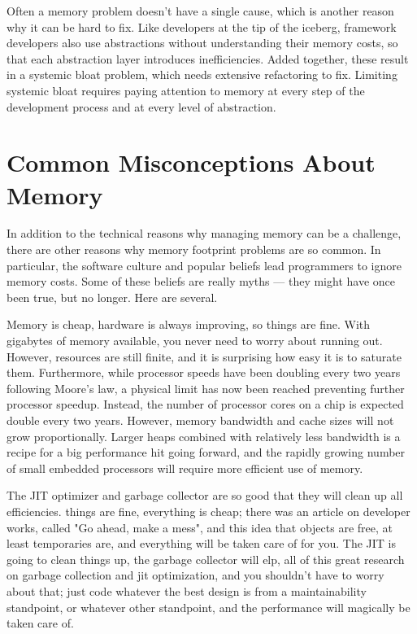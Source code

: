 Often a memory problem doesn't have a single cause, which is another reason why
it can be hard to fix. Like developers at the tip of the iceberg, framework
developers also use abstractions without understanding their memory costs, so
that each abstraction layer introduces inefficiencies. Added together, these  
result in a systemic bloat problem, which needs extensive refactoring to
fix. Limiting systemic bloat requires paying attention to memory
 at every step of the development process and at every level of abstraction.


\section{Common Misconceptions About Memory}

In addition to the technical reasons why managing memory can be a challenge, there
are other reasons why memory footprint problems are so common. In particular,
the software culture and popular beliefs lead programmers to ignore memory
costs. Some of these beliefs are really myths --- they might have once
been true, but no longer. Here are several.

 Memory is cheap, hardware is always improving, so things are fine.
 With gigabytes of memory available, you never need to worry about running out.
However, resources are still finite, and it is surprising how easy it is to
saturate them. Furthermore, while processor speeds have been doubling every two
years following Moore's law, a physical limit has now been reached preventing further processor speedup. 
Instead, the number of processor cores on a chip is expected double every two years. However,
memory bandwidth and cache sizes will not grow proportionally. 
 Larger heaps combined with relatively less bandwidth is a recipe for a big performance hit going forward, 
 and the rapidly growing number of small embedded processors will require more
 efficient use of memory.

 The JIT optimizer and garbage collector are so good that they will
clean up all efficiencies. things are fine, everything is cheap; there was an
article on developer works, called "Go ahead, make a mess",  and this idea that objects are free, at least temporaries are,
 and everything will be taken care of for you. The JIT is going to clean things up, the garbage collector will elp, 
 all of this great research 
  on garbage collection and jit optimization, and you shouldn't have to worry about that; just code whatever the best design 
  is from a maintainability standpoint, or whatever other standpoint, and the performance will magically be taken care of.

